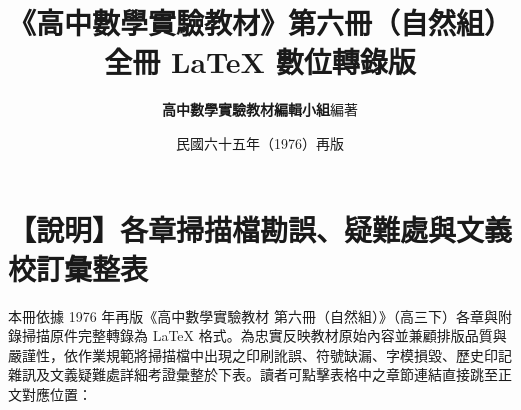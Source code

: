 \documentclass[a4paper,12pt,twoside]{article}
\title{\LARGE\textbf{《高中數學實驗教材》第六冊（自然組）}\\[0.5em] \Large\textbf{全冊 \LaTeX{} 數位轉錄版}}
\author{\textbf{高中數學實驗教材編輯小組}\quad 編著}
\date{民國六十五年（1976）再版}
\begin{document}
\maketitle
\thispagestyle{empty}

\section*{【說明】各章掃描檔勘誤、疑難處與文義校訂彙整表}
\label{sec:master_errata_notes_b6}
\label{sec:current_errata}

本冊依據 1976 年再版《高中數學實驗教材 第六冊（自然組）》（高三下）各章與附錄掃描原件完整轉錄為 \LaTeX{} 格式。為忠實反映教材原始內容並兼顧排版品質與嚴謹性，依作業規範將掃描檔中出現之印刷訛誤、符號缺漏、字模損毀、歷史印記雜訊及文義疑難處詳細考證彙整於下表。讀者可點擊表格中之章節連結直接跳至正文對應位置：
\end{document}
